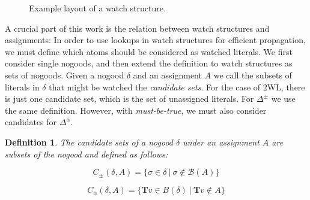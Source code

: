 \documentclass[final]{vutinfth} %
\newtheorem{definition}{Definition}[chapter]
\newcommand{\mbt}{must-be-true\xspace}
\newcommand{\bass}{\mathcal{B}}
\newcommand{\ass}{A}
\newcommand{\bT}{\mathbf{T}}
\newcommand{\bX}{\mathbf{X}}
\newcommand{\cdpm}{C_\pm}
\newcommand{\cdal}{C_\alpha}
\newcommand{\dpm}{\Delta^\pm}
\newcommand{\dal}{\Delta^\alpha}
\newcommand{\bodyf}{B}
\newcommand{\bsgl}{\sigma}
\begin{document}
\begin{figure}
  \centering
{}
  \caption[Example layout of a watch structure]{Example layout of a watch structure.}
  \label{fig:watches} %
\end{figure}

A crucial part of this work is the relation between watch structures and assignments: In order to use lookups in watch structures for efficient propagation, we must define which atoms should be considered as watched literals. We first consider single nogoods, and then extend the definition to watch structures as sets of nogoods. Given a nogood $\delta$ and an assignment $\ass$ we call the subsets of literals in $\delta$ that might be watched the \emph{candidate sets}. For the case of 2WL, there is just one candidate set, which is the set of unassigned literals. For $\dpm$ we use the same definition. However, with \emph{\mbt}, we must also consider candidates for $\dal$.


\begin{definition}
The \emph{candidate sets} of a nogood $\delta$ under an assignment $A$ are subsets of the nogood  and defined as follows:

$$\cdpm(\delta, A) = \{\bsgl \in \delta \ | \ \bsgl \not \in \bass(\ass) \}$$

$$\cdal(\delta, A) = \{ \bT v \in \bodyf(\delta) \ | \ \bT v \not \in \ass \}$$
\end{definition}
\end{document}
